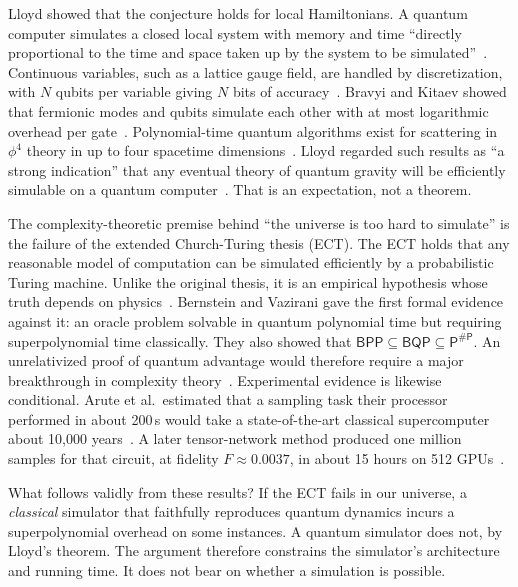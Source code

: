 Lloyd showed that the conjecture holds for local Hamiltonians. A quantum
computer simulates a closed local system with memory and time ``directly
proportional to the time and space taken up by the system to be
simulated''~\cite{Lloyd1996universal}. Continuous variables, such as a lattice
gauge field, are handled by discretization, with $N$ qubits per variable giving
$N$ bits of accuracy~\cite{Lloyd1996universal}. Bravyi and Kitaev showed that
fermionic modes and qubits simulate each other with at most logarithmic
overhead per gate~\cite{Bravyi2002fermionic}. Polynomial-time quantum
algorithms exist for scattering in $\phi^4$ theory in up to four spacetime
dimensions~\cite{Jordan2012quantum}. Lloyd regarded such results as ``a strong
indication'' that any eventual theory of quantum gravity will be efficiently
simulable on a quantum computer~\cite{Lloyd2002computational}. That is an
expectation, not a theorem.

The complexity-theoretic premise behind ``the universe is too hard to
simulate'' is the failure of the extended Church-Turing thesis (ECT). The ECT
holds that any reasonable model of computation can be simulated efficiently by
a probabilistic Turing machine. Unlike the original thesis, it is an empirical
hypothesis whose truth depends on physics~\cite{Copeland2023churchturing}.
Bernstein and Vazirani gave the first formal evidence against it: an oracle
problem solvable in quantum polynomial time but requiring superpolynomial time
classically. They also showed that $\mathsf{BPP}\subseteq\mathsf{BQP}\subseteq
\mathsf{P}^{\#\mathsf{P}}$. An unrelativized proof of quantum advantage would
therefore require a major breakthrough in complexity
theory~\cite{Bernstein1997quantum}. Experimental evidence is likewise
conditional. Arute et al.\ estimated that a sampling task their processor
performed in about 200\,s would take a state-of-the-art classical supercomputer
about 10{,}000 years~\cite{Arute2019quantum}. A later tensor-network method
produced one million samples for that circuit, at fidelity $F\approx0.0037$, in
about 15 hours on 512 GPUs~\cite{Pan2022solving}.

What follows validly from these results? If the ECT fails in our universe, a
\emph{classical} simulator that faithfully reproduces quantum dynamics incurs a
superpolynomial overhead on some instances. A quantum simulator does not, by
Lloyd's theorem. The argument therefore constrains the simulator's architecture
and running time. It does not bear on whether a simulation is possible.

